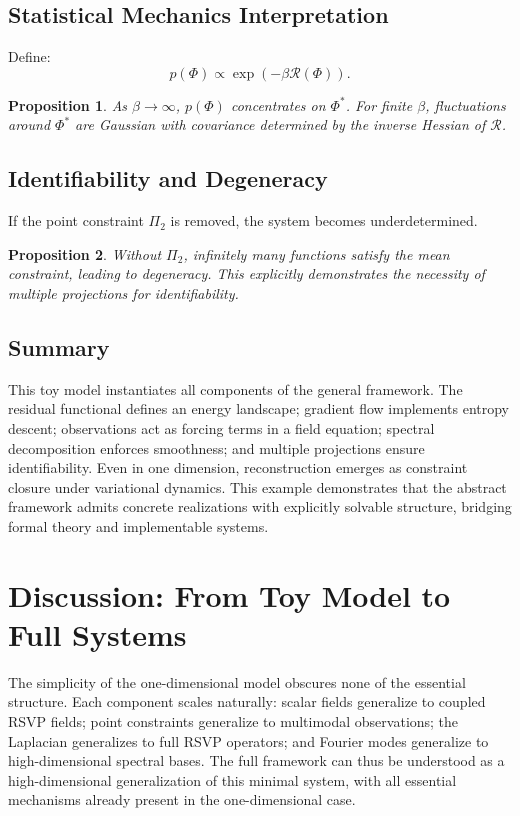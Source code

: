 \documentclass[12pt]{article}
\newtheorem{proposition}{Proposition}
\begin{document}
\subsection{Statistical Mechanics Interpretation}

Define:
\[
p(\Phi) \propto \exp(-\beta \mathcal{R}(\Phi)).
\]

\begin{proposition}
As $\beta \to \infty$, $p(\Phi)$ concentrates on $\Phi^*$. For finite $\beta$, fluctuations around $\Phi^*$ are Gaussian with covariance determined by the inverse Hessian of $\mathcal{R}$.
\end{proposition}

\subsection{Identifiability and Degeneracy}

If the point constraint $\Pi_2$ is removed, the system becomes underdetermined.

\begin{proposition}
Without $\Pi_2$, infinitely many functions satisfy the mean constraint, leading to degeneracy. This explicitly demonstrates the necessity of multiple projections for identifiability.
\end{proposition}

\subsection{Summary}

This toy model instantiates all components of the general framework. The residual functional defines an energy landscape; gradient flow implements entropy descent; observations act as forcing terms in a field equation; spectral decomposition enforces smoothness; and multiple projections ensure identifiability. Even in one dimension, reconstruction emerges as constraint closure under variational dynamics. This example demonstrates that the abstract framework admits concrete realizations with explicitly solvable structure, bridging formal theory and implementable systems.

\section{Discussion: From Toy Model to Full Systems}

The simplicity of the one-dimensional model obscures none of the essential structure. Each component scales naturally: scalar fields generalize to coupled RSVP fields; point constraints generalize to multimodal observations; the Laplacian generalizes to full RSVP operators; and Fourier modes generalize to high-dimensional spectral bases. The full framework can thus be understood as a high-dimensional generalization of this minimal system, with all essential mechanisms already present in the one-dimensional case.
\end{document}
